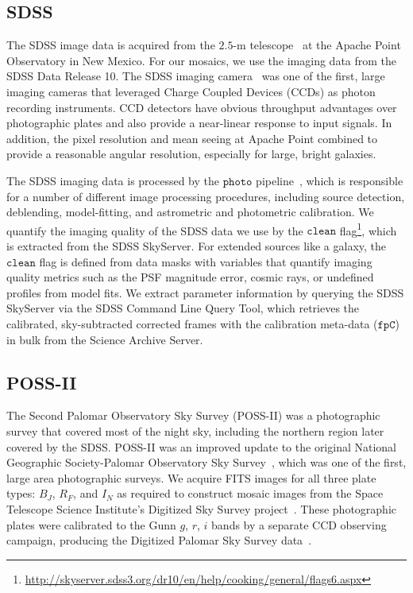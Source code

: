\documentclass[authoryear, 12pt, 5p, times]{elsarticle}
\begin{document}
\subsection{SDSS}
The SDSS image data is acquired from the $2.5$-m telescope~\citep{sdss-tel} at the Apache Point Observatory in New Mexico. For our mosaics, we use the imaging data from the SDSS Data Release 10. The SDSS imaging camera~\citep{sdss-camera} was one of the first, large imaging cameras that leveraged Charge Coupled Devices (CCDs) as photon recording instruments. CCD detectors have obvious throughput advantages over photographic plates and also provide a near-linear response to input signals. In addition, the pixel resolution and mean seeing at Apache Point combined to provide a reasonable angular resolution, especially for large, bright galaxies. 

The SDSS imaging data is processed by the $\texttt{photo}$ pipeline~\citep{sdss-photo}, which is responsible for a number of different image processing procedures, including source detection, deblending, model-fitting, and astrometric and photometric calibration. We quantify the imaging quality of the SDSS data we use by the $\texttt{clean}$ flag\footnote{\url{http://skyserver.sdss3.org/dr10/en/help/cooking/general/flags6.aspx}}, which is extracted from the SDSS SkyServer. For extended sources like a galaxy, the $\texttt{clean}$ flag is defined from data masks with variables that quantify imaging quality metrics such as the PSF magnitude error, cosmic rays, or undefined profiles from model fits. We extract parameter information by querying the SDSS SkyServer via the SDSS Command Line Query Tool, which retrieves the calibrated, sky-subtracted corrected frames with the calibration meta-data ($\texttt{fpC}$) in bulk from the Science Archive Server.

\subsection{POSS-II\label{POSSII}}
The Second Palomar Observatory Sky Survey (POSS-II) was a photographic survey that covered most of the night sky, including the northern region later covered by the SDSS. POSS-II was an improved update to the original National Geographic Society-Palomar Observatory Sky Survey~\citep[NGS-POSS or POSS-I;][]{ngs-poss}, which was one of the first, large area photographic surveys. We acquire FITS images for all three plate types: $B_J$, $R_F$, and $I_N$ as required to construct mosaic images from the Space Telescope Science Institute's Digitized Sky Survey project~\citep[DSS;][]{dss}.  These photographic plates were calibrated to the  Gunn $g$, $r$, $i$ bands by a separate CCD observing campaign, producing the Digitized Palomar Sky Survey data~\citep[DPOSS;][]{dposs}. 
\end{document}
